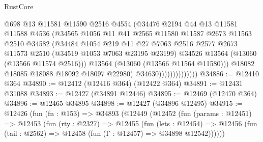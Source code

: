 \begin{lexlean}{RustCore}
\begin{coremodule}
                                @698
                                @13
                                @11581
                                @11590
                                @2516
                                @4554
                                (@34476
                                  @2194
                                  @44
                                  @13
                                  @11581
                                  @11588
                                  @4536
                                  (@34565
                                    @1056
                                    @11
                                    @41
                                    @2565
                                    @11580
                                    @11587
                                    @2673
                                    @11563
                                    @2510
                                    @34582
                                    (@34484
                                      @1054
                                      @219
                                      @11
                                      @27
                                      @7063
                                      @2516
                                      @2577
                                      @2673
                                      @11573
                                      @2510
                                      (@34519 @1053 @7063 @23195 @23199)
                                      @34526
                                      @13564
                                      (@13060 (@13566 @11574 @2516)))
                                    @13564
                                    (@13060 (@13566 @11564 @11580)))
                                  @18082
                                  @18085
                                  @18088
                                  @18092
                                  @18097
                                  @22980)
                                @34630))))))))))))))
@34886 := @12410 @364
@34890 := @12412 (@12416 @364) (@12422 @364)
@34891 := @12431 @31088
@34893 := @12427 (@34891 @12446)
@34895 := @12469 (@12470 @364)
@34896 := @12465 @34895
@34898 := @12427 (@34896 @12495)
@34915 := @12426
    (fun (fn : @153) =>
    @34893
      (@12449
        (@12452
          (fun (params : @12451) =>
          @12453
            (fun (rty : @2327) =>
            @12455
              (fun (lets : @12454) =>
              @12456 (fun (tail : @2562) => @12458 (fun (Γ : @12457) => @34898 @12542))))))

\end{coremodule}
\end{lexlean}
